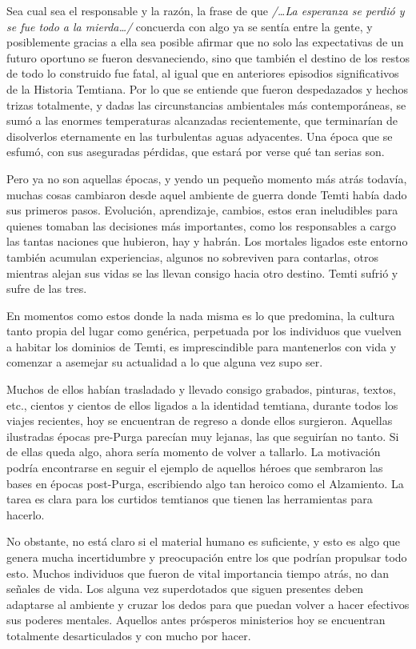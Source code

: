 \documentclass[
  spanish,
]{book}
\begin{document}
Sea cual sea el responsable y la razón, la frase de que \emph{/\ldots La esperanza se perdió y se fue todo a la mierda\ldots/} concuerda con algo ya se sentía entre la gente, y posiblemente gracias a ella sea posible afirmar que no solo las expectativas de un futuro oportuno se fueron desvaneciendo, sino que también el destino de los restos de todo lo construido fue fatal, al igual que en anteriores episodios significativos de la Historia Temtiana. Por lo que se entiende que fueron despedazados y hechos trizas totalmente, y dadas las circunstancias ambientales más contemporáneas, se sumó a las enormes temperaturas alcanzadas recientemente, que terminarían de disolverlos eternamente en las turbulentas aguas adyacentes. Una época que se esfumó, con sus aseguradas pérdidas, que estará por verse qué tan serias son.

Pero ya no son aquellas épocas, y yendo un pequeño momento más atrás todavía, muchas cosas cambiaron desde aquel ambiente de guerra donde Temti había dado sus primeros pasos. Evolución, aprendizaje, cambios, estos eran ineludibles para quienes tomaban las decisiones más importantes, como los responsables a cargo las tantas naciones que hubieron, hay y habrán. Los mortales ligados este entorno también acumulan experiencias, algunos no sobreviven para contarlas, otros mientras alejan sus vidas se las llevan consigo hacia otro destino. Temti sufrió y sufre de las tres.

En momentos como estos donde la nada misma es lo que predomina, la cultura tanto propia del lugar como genérica, perpetuada por los individuos que vuelven a habitar los dominios de Temti, es imprescindible para mantenerlos con vida y comenzar a asemejar su actualidad a lo que alguna vez supo ser.

Muchos de ellos habían trasladado y llevado consigo grabados, pinturas, textos, etc., cientos y cientos de ellos ligados a la identidad temtiana, durante todos los viajes recientes, hoy se encuentran de regreso a donde ellos surgieron. Aquellas ilustradas épocas pre-Purga parecían muy lejanas, las que seguirían no tanto. Si de ellas queda algo, ahora sería momento de volver a tallarlo. La motivación podría encontrarse en seguir el ejemplo de aquellos héroes que sembraron las bases en épocas post-Purga, escribiendo algo tan heroico como el Alzamiento. La tarea es clara para los curtidos temtianos que tienen las herramientas para hacerlo.

No obstante, no está claro si el material humano es suficiente, y esto es algo que genera mucha incertidumbre y preocupación entre los que podrían propulsar todo esto. Muchos individuos que fueron de vital importancia tiempo atrás, no dan señales de vida. Los alguna vez superdotados que siguen presentes deben adaptarse al ambiente y cruzar los dedos para que puedan volver a hacer efectivos sus poderes mentales. Aquellos antes prósperos ministerios hoy se encuentran totalmente desarticulados y con mucho por hacer.
\end{document}

